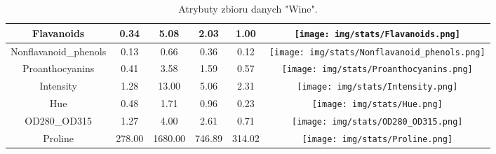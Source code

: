 \begin{table}[H]
  \center
 \begin{tabular}{|c|c|c|c|c|c|} \hline
           Flavanoids &    0.34 &     5.08 &    2.03 &    1.00 &            \texttt{[image: img/stats/Flavanoids.png]} \\ \hline
 Nonflavanoid\_phenols &    0.13 &     0.66 &    0.36 &    0.12 &  \texttt{[image: img/stats/Nonflavanoid\_phenols.png]} \\ \hline
      Proanthocyanins &    0.41 &     3.58 &    1.59 &    0.57 &       \texttt{[image: img/stats/Proanthocyanins.png]} \\ \hline
            Intensity &    1.28 &    13.00 &    5.06 &    2.31 &             \texttt{[image: img/stats/Intensity.png]} \\ \hline
                  Hue &    0.48 &     1.71 &    0.96 &    0.23 &                   \texttt{[image: img/stats/Hue.png]} \\ \hline
          OD280\_OD315 &    1.27 &     4.00 &    2.61 &    0.71 &           \texttt{[image: img/stats/OD280\_OD315.png]} \\ \hline
              Proline &  278.00 &  1680.00 &  746.89 &  314.02 &               \texttt{[image: img/stats/Proline.png]} \\ \hline

\end{tabular} 
  \caption{Atrybuty zbioru danych "Wine".}
\end{table}
